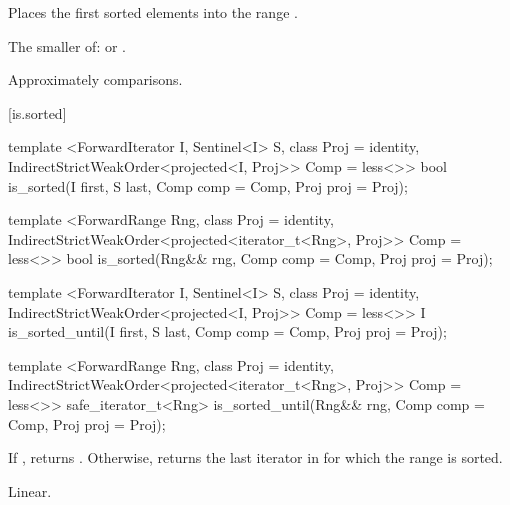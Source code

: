 \begin{itemdescr}
\pnum
\effects
Places the first
sorted elements into the range
.

\pnum
\returns
The smaller of:
 or
.

\pnum
\complexity
Approximately
comparisons.
\end{itemdescr}

[is.sorted]{}

%
\begin{itemdecl}
template <ForwardIterator I, Sentinel<I> S, class Proj = identity,
    IndirectStrictWeakOrder<projected<I, Proj>> Comp = less<>>
  bool is_sorted(I first, S last, Comp comp = Comp{}, Proj proj = Proj{});

template <ForwardRange Rng, class Proj = identity,
    IndirectStrictWeakOrder<projected<iterator_t<Rng>, Proj>> Comp = less<>>
  bool
    is_sorted(Rng&& rng, Comp comp = Comp{}, Proj proj = Proj{});
\end{itemdecl}

\begin{itemdescr}
\pnum
\returns {}
\end{itemdescr}

%
\begin{itemdecl}
template <ForwardIterator I, Sentinel<I> S, class Proj = identity,
    IndirectStrictWeakOrder<projected<I, Proj>> Comp = less<>>
  I is_sorted_until(I first, S last, Comp comp = Comp{}, Proj proj = Proj{});

template <ForwardRange Rng, class Proj = identity,
    IndirectStrictWeakOrder<projected<iterator_t<Rng>, Proj>> Comp = less<>>
  safe_iterator_t<Rng>
    is_sorted_until(Rng&& rng, Comp comp = Comp{}, Proj proj = Proj{});
\end{itemdecl}

\begin{itemdescr}
\pnum
\returns If , returns
. Otherwise, returns
the last iterator  in  for which the
range  is sorted.

\pnum
\complexity Linear.
\end{itemdescr}

